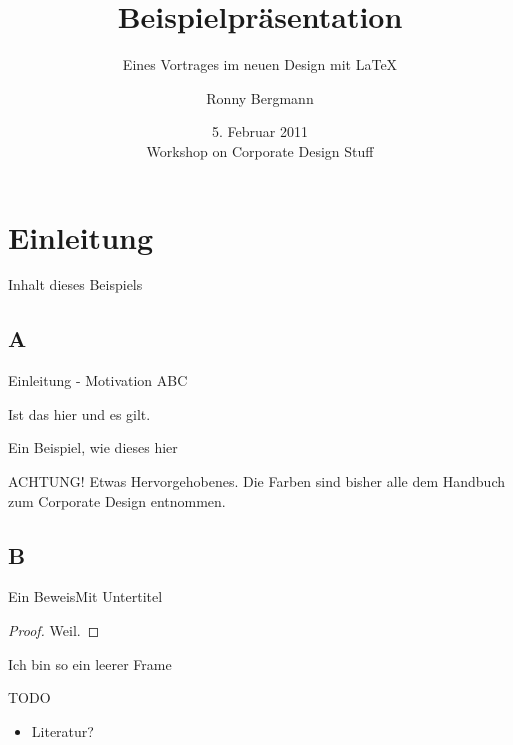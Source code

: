 \documentclass[german,10pt,xcolor=colortbl,compress
]{beamer}
\title{Beispielpräsentation}
\subtitle{Eines Vortrages im neuen Design mit \LaTeX}
\date[]{5. Februar 2011\\[1ex] Workshop on Corporate Design Stuff}
\author[R. Bergmann]{Ronny Bergmann}
\begin{document}
	\maketitle	
	\section{Einleitung}
	\begin{frame}{Inhalt dieses Beispiels}
		\tableofcontents
	\end{frame}
	\subsection{A}
	\begin{frame}{Einleitung - Motivation}
	ABC
	\begin{lemma}
		Ist das hier und es gilt.
	\end{lemma}
	\begin{example}
		Ein Beispiel, wie dieses hier
	\end{example}
	\alert{ACHTUNG!}
		Etwas Hervorgehobenes. Die Farben sind bisher alle dem Handbuch zum Corporate Design entnommen.
	\end{frame}
	\subsection{B}
	\begin{frame}{Ein Beweis}{Mit Untertitel}
			\begin{proof}
				Weil.
			\end{proof}
	\end{frame}
	\begin{frame}[plain]{}{}%
		Ich bin so ein leerer Frame
	\end{frame}
	
	\begin{frame}{TODO}
		\begin{itemize}
			\item Literatur?
		\end{itemize}
	\end{frame}
\end{document}
